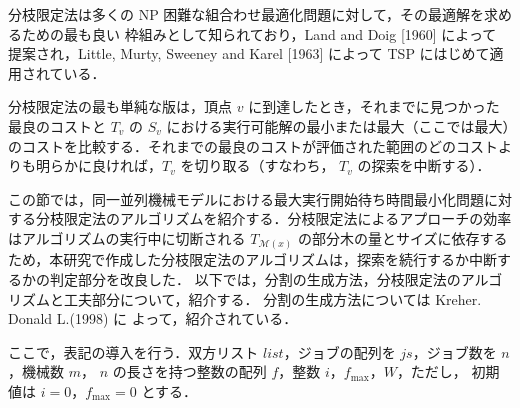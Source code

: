 \documentclass[12pt]{optlab-bachelor}
\begin{document}
分枝限定法は多くの NP 困難な組合わせ最適化問題に対して，その最適解を求めるための最も良い
枠組みとして知られており，Land and Doig [1960] \cite{BandB} によって
提案され，Little, Murty, Sweeney and Karel [1963] \cite{BandB2}
によって TSP にはじめて適用されている．


分枝限定法の最も単純な版は，頂点 $v$ に到達したとき，それまでに見つかった最良のコストと $T_v$
の $S_v$ における実行可能解の最小または最大（ここでは最大）のコストを比較する．それまでの最良のコストが評価された範囲のどのコストよりも明らかに良ければ，$T_v$ を切り取る（すなわち， $T_v$ の探索を中断する）．


この節では，同一並列機械モデルにおける最大実行開始待ち時間最小化問題に対する分枝限定法のアルゴリズムを紹介する．分枝限定法によるアプローチの効率はアルゴリズムの実行中に切断される $T_{\mathcal{M}(x)}$ の部分木の量とサイズに依存するため，本研究で作成した分枝限定法のアルゴリズムは，探索を続行するか中断するかの判定部分を改良した．
以下では，分割の生成方法，分枝限定法のアルゴリズムと工夫部分について，紹介する．
分割の生成方法については Kreher. Donald L.(1998) \cite{Partition} に
よって，紹介されている．

ここで，表記の導入を行う．双方リスト $list$，ジョブの配列を $js$，ジョブ数を $n$，機械数 $m$，
$n$ の長さを持つ整数の配列 $f$，整数 $i$，$f_{\max}$，$W$，ただし，
初期値は $i = 0$，$f_{\max} = 0$ とする．
\end{document}
